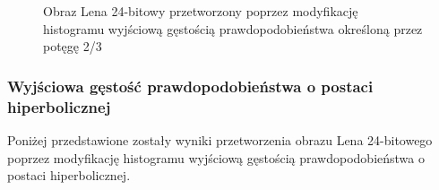 \documentclass{classrep}
\begin{document}
\begin{figure}[H]%
    \centering
    \qquad
    \qquad
    \qquad
    \caption{Obraz Lena 24-bitowy przetworzony poprzez modyfikację histogramu wyjściową gęstością prawdopodobieństwa określoną przez potęgę 2/3}%
\end{figure}

\subsubsection{Wyjściowa gęstość prawdopodobieństwa o postaci hiperbolicznej}
Poniżej przedstawione zostały wyniki przetworzenia obrazu Lena 24-bitowego poprzez modyfikację histogramu wyjściową gęstością prawdopodobieństwa o postaci hiperbolicznej.
\end{document}
